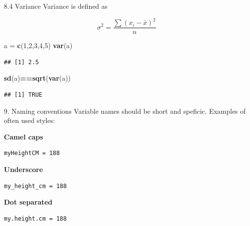 \documentclass[
  ignorenonframetext,
]{beamer}
\newenvironment{Shaded}{\begin{snugshade}}{\end{snugshade}}
\newcommand{\DecValTok}[1]{\textcolor[rgb]{0.00,0.00,0.81}{#1}}
\newcommand{\FunctionTok}[1]{\textcolor[rgb]{0.13,0.29,0.53}{\textbf{#1}}}
\newcommand{\NormalTok}[1]{#1}
\newcommand{\OtherTok}[1]{\textcolor[rgb]{0.56,0.35,0.01}{#1}}
\newcommand{\SpecialCharTok}[1]{\textcolor[rgb]{0.81,0.36,0.00}{\textbf{#1}}}
\begin{document}
\begin{frame}[fragile]{8.4 Variance}
\protect\hypertarget{variance}{}
Variance is defined as

\[ \sigma^2 = \frac{ \sum (x_{i} - \bar{x})^2}{n} \]

\begin{Shaded}
\begin{Highlighting}[]
\NormalTok{a }\OtherTok{=} \FunctionTok{c}\NormalTok{(}\DecValTok{1}\NormalTok{,}\DecValTok{2}\NormalTok{,}\DecValTok{3}\NormalTok{,}\DecValTok{4}\NormalTok{,}\DecValTok{5}\NormalTok{)}
\FunctionTok{var}\NormalTok{(a)}
\end{Highlighting}
\end{Shaded}

\begin{verbatim}
## [1] 2.5
\end{verbatim}

\begin{Shaded}
\begin{Highlighting}[]
\FunctionTok{sd}\NormalTok{(a)}\SpecialCharTok{==}\FunctionTok{sqrt}\NormalTok{(}\FunctionTok{var}\NormalTok{(a))}
\end{Highlighting}
\end{Shaded}

\begin{verbatim}
## [1] TRUE
\end{verbatim}
\end{frame}

\begin{frame}[fragile]
\begin{block}{9. Naming conventions}
\protect\hypertarget{naming-conventions}{}
Variable names should be short and speficic. Examples of often used
styles:

\textbf{Camel caps}

\begin{verbatim}
myHeightCM = 188
\end{verbatim}

\textbf{Underscore}

\begin{verbatim}
my_height_cm = 188
\end{verbatim}

\textbf{Dot separated}

\begin{verbatim}
my.height.cm = 188
\end{verbatim}
\end{block}
\end{frame}
\end{document}
